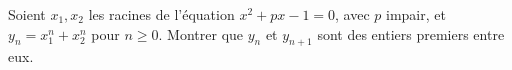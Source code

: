 Soient $x_1, x_2$ les racines de l'équation $x^2 + px - 1 = 0$, avec $p$ impair, et $y_n = x_1^n + x_2^n$ pour $n \geq 0$. Montrer que $y_n$ et $y_{n+1}$ sont des entiers premiers entre eux.
